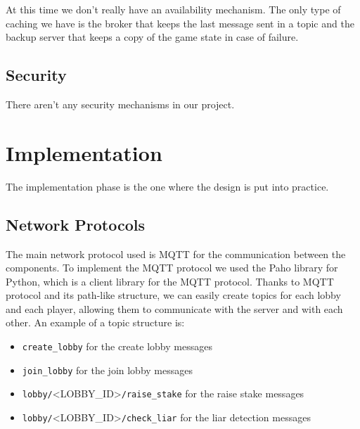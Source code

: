 \documentclass{scrartcl}
\begin{document}
At this time we don't really have an availability mechanism. \newline
The only type of caching we have is the broker that keeps the last message sent in a topic
and the backup server that keeps a copy of the game state in case of failure.

\subsection{Security}\label{security}

There aren't any security mechanisms in our project. \newline


\newpage

\section{Implementation}\label{implementation}

The implementation phase is the one where the design is put into practice.
\subsection{Network Protocols}\label{network-protocols}
The main network protocol used is MQTT for the communication between the components.
To implement the MQTT protocol we used the Paho library for Python, which is a client library for the MQTT protocol. \newline
Thanks to MQTT protocol and its path-like structure, we can easily create topics for each lobby and each player, allowing them to communicate with the server and with each other. \newline
An example of a topic structure is:
\begin{itemize}
      \item \texttt{create\_lobby} for the create lobby messages
      \item \texttt{join\_lobby} for the join lobby messages
      \item \texttt{lobby/}\textless LOBBY\_ID\textgreater\texttt{/raise\_stake} for the raise stake messages
      \item \texttt{lobby/}\textless LOBBY\_ID\textgreater\texttt{/check\_liar} for the liar detection messages
\end{itemize}
\end{document}
